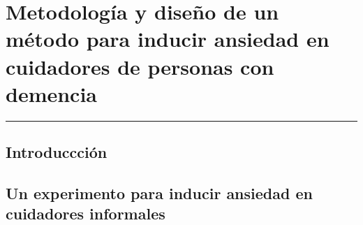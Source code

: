 \chapter{Metodolog\'ia y dise\~no de un m\'etodo para inducir ansiedad en cuidadores de personas con demencia}\label{capit:cap3}
\vspace{-2.0325ex}%
\noindent
\rule{\textwidth}{0.5pt}
\vspace{-5.5ex}%
\newcommand{\pushline}{\Indp}%
\section{Introduccci\'on}\label{secc:introduction}
\section{Un experimento para inducir ansiedad en cuidadores informales}

\newpage

